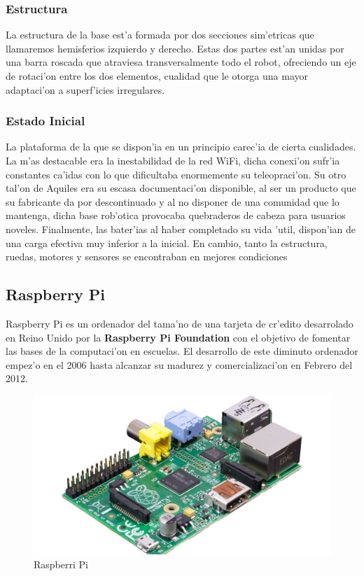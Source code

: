 \documentclass[twoside,12pt]{article}
\begin{document}
\subsubsection{Estructura}

La estructura de la base est'a formada por dos secciones sim'etricas que llamaremos hemisferios izquierdo y derecho. Estas dos partes est'an unidas por una barra roscada que atraviesa transversalmente todo el robot, ofreciendo un eje de rotaci'on entre los dos elementos, cualidad que le otorga una mayor adaptaci'on a superf'icies irregulares.

\subsubsection{Estado Inicial}  
La plataforma de la que se dispon'ia en un principio carec'ia de cierta cualidades. La m'as destacable era la inestabilidad de la red WiFi, dicha conexi'on sufr'ia constantes ca'idas con lo que dificultaba enormemente su teleopraci'on. Su otro tal'on de Aquiles era su escasa documentaci'on disponible, al ser un producto que su fabricante da por descontinuado y al no disponer de una comunidad que lo mantenga, dicha base rob'otica provocaba quebraderos de cabeza para usuarios noveles. Finalmente, las bater'ias al haber completado su vida 'util, dispon'ian de una carga efectiva muy inferior a la inicial. En cambio, tanto la estructura, ruedas, motores y sensores se encontraban en mejores condiciones\\
\newpage

\subsection{Raspberry Pi}
Raspberry Pi es un ordenador del tama'no de una tarjeta de cr'edito desarrolado en Reino Unido por la \textbf{Raspberry Pi Foundation} con el objetivo de fomentar las bases de la computaci'on en escuelas. El desarrollo de este diminuto ordenador empez'o en el 2006 hasta alcanzar su madurez y comercializaci'on en Febrero del 2012. 

\begin{figure}[ht]
\centering
\includegraphics[scale=0.2]{images/raspi.png} 
\caption{Raspberri Pi}
\label{fig:Raspberry Pi}
\end{figure}
\end{document}
